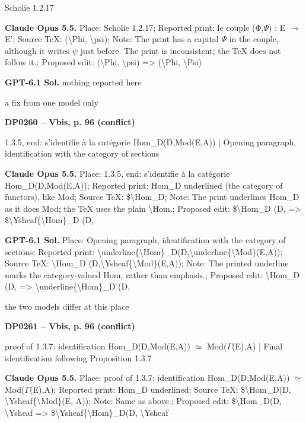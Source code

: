Scholie 1.2.17\par
\textbf{Claude Opus 5.5.} Place: Scholie 1.2.17; Reported print: le couple (Φ,\ensuremath{\Psi}) : E \ensuremath{\longrightarrow} E'; Source TeX: (\textbackslash{}Phi, \textbackslash{}psi); Note: The print has a capital \ensuremath{\Psi} in the couple, although it writes \ensuremath{\psi} just before. The print is inconsistent; the TeX does not follow it.; Proposed edit: (\textbackslash{}Phi, \textbackslash{}psi) =\allowbreak > (\textbackslash{}Phi, \textbackslash{}Psi)\par
\textbf{GPT-6.1 Sol.} nothing reported here\par
a fix from one model only\par
\par\noindent\hypertarget{DP0260}{}\textbf{DP0260 -- Vbis, p. 96 (conflict)}\par
1.3.5, end: s'identifie à la catégorie Hom\_D(D,Mod(E,A)) | Opening paragraph, identification with the category of sections\par
\textbf{Claude Opus 5.5.} Place: 1.3.5, end: s'identifie à la catégorie Hom\_D(D,Mod(E,A)); Reported print: Hom\_D underlined (the category of functors), like Mod; Source TeX: \$\textbackslash{}Hom\_D; Note: The print underlines Hom\_D as it does Mod; the TeX uses the plain \textbackslash{}Hom.; Proposed edit: \$\textbackslash{}Hom\_D (D, =\allowbreak > \$\textbackslash{}Ysheaf\{\textbackslash{}Hom\}\_D (D,\par
\textbf{GPT-6.1 Sol.} Place: Opening paragraph, identification with the category of sections; Reported print: \textbackslash{}underline\{\textbackslash{}Hom\}\_D(D,\textbackslash{}underline\{\textbackslash{}Mod\}(E,A)); Source TeX: \textbackslash{}Hom\_D (D,\textbackslash{}Ysheaf\{\textbackslash{}Mod\}(E,A)); Note: The printed underline marks the category-valued Hom, rather than emphasis.; Proposed edit: \textbackslash{}Hom\_D (D, =\allowbreak > \textbackslash{}underline\{\textbackslash{}Hom\}\_D (D,\par
the two models differ at this place\par
\par\noindent\hypertarget{DP0261}{}\textbf{DP0261 -- Vbis, p. 96 (conflict)}\par
proof of 1.3.7: identification Hom\_D(D,Mod(E,A)) \ensuremath{\simeq} Mod(\ensuremath{\Gamma}(E),A) | Final identification following Proposition 1.3.7\par
\textbf{Claude Opus 5.5.} Place: proof of 1.3.7: identification Hom\_D(D,Mod(E,A)) \ensuremath{\simeq} Mod(\ensuremath{\Gamma}(E),A); Reported print: Hom\_D underlined; Source TeX: \$\textbackslash{}Hom\_D(D, \textbackslash{}Ysheaf\{\textbackslash{}Mod\}(E, A)); Note: Same as above.; Proposed edit: \$\textbackslash{}Hom\_D(D, \textbackslash{}Ysheaf =\allowbreak > \$\textbackslash{}Ysheaf\{\textbackslash{}Hom\}\_D(D, \textbackslash{}Ysheaf\par

